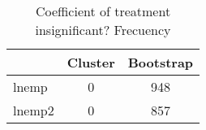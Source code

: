 \begin{table}[htbp]\centering
\caption{Coefficient of treatment insignificant? Frecuency}
\begin{tabular}{l*{2}{c}}
\toprule
            &     Cluster&   Bootstrap\\
\midrule
lnemp       &           0&         948\\
lnemp2      &           0&         857\\
\bottomrule
\end{tabular}
\end{table}
